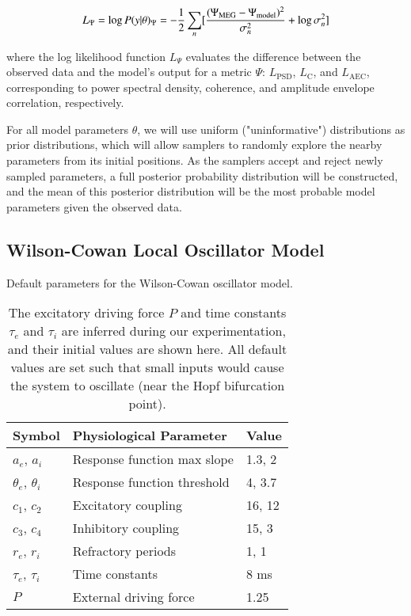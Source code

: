 \begin{equation}
\label{eq:ll}
    L_{\Psi} = \log P(y | \theta)_{\Psi} = - \frac{1}{2} \sum_n [\frac{(\Psi_{\textrm{MEG}} - \Psi_{\textrm{model}})^2}{\sigma_n^2} + \log \sigma_n^2] \\
\end{equation}

where the log likelihood function $L_{\Psi}$ evaluates the difference between the observed data and the model's output for a metric $\Psi$: $L_{\textrm{PSD}}$, $L_{\textrm{C}}$, and $L_{\textrm{AEC}}$, corresponding to power spectral density, coherence, and amplitude envelope correlation, respectively.

For all model parameters $\theta$, we will use uniform ("uninformative") distributions as prior distributions, which will allow samplers to randomly explore the nearby parameters from its initial positions. As the samplers accept and reject newly sampled parameters, a full posterior probability distribution will be constructed, and the mean of this posterior distribution will be the most probable model parameters given the observed data.

\subsection{Wilson-Cowan Local Oscillator Model}

\begin{table}[]
    \centering
    \caption{Default parameters for the Wilson-Cowan oscillator model.}
    \caption*{The excitatory driving force $P$ and time constants $\tau_e$ and $\tau_i$ are inferred during our experimentation, and their initial values are shown here. All default values are set such that small inputs would cause the system to oscillate (near the Hopf bifurcation point).}
    \begin{tabular}{lll}
    \toprule
    \cmidrule(r){1-2}
    Symbol                 &  Physiological Parameter     & Value \\
    \midrule
    $a_e$, $a_i$           &  Response function max slope & 1.3, 2 \\
    $\theta_e$, $\theta_i$ &  Response function threshold & 4, 3.7 \\
    $c_1$, $c_2$           &  Excitatory coupling         & 16, 12 \\
    $c_3$, $c_4$           &  Inhibitory coupling         & 15, 3  \\
    $r_e$, $r_i$           &  Refractory periods          & 1, 1 \\
    $\tau_e$, $\tau_i$     &  Time constants              & 8 ms \\
    $P$                    &  External driving force      & 1.25 \\
    \bottomrule
    \end{tabular}
    \label{tab:oscillator_parameters}
\end{table}

